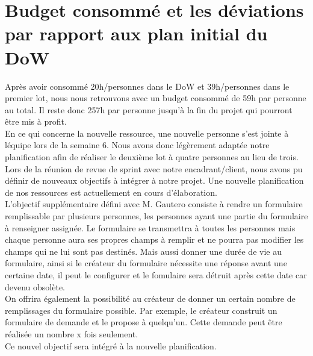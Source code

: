 \documentclass{sigplanconf}
\begin{document}
\section{Budget consomm\'e et les d\'eviations par rapport aux plan initial du DoW}
Apr\`es avoir consomm\'e 20h/personnes dans le DoW et 39h/personnes dans le premier lot, nous nous retrouvons avec un budget consomm\'e de 59h par personne au total. Il reste donc 257h par personne jusqu'\`a la fin du projet qui pourront \^etre mis \`a profit.\\
En ce qui concerne la nouvelle ressource, une nouvelle personne s'est jointe \`a l\'equipe lors de la semaine 6. Nous avons donc l\'eg\`erement adapt\'ee notre planification afin de r\'ealiser le deuxi\`eme lot \`a quatre personnes au lieu de trois. Lors de la r\'eunion de revue de sprint avec notre encadrant/client, nous avons pu d\'efinir de nouveaux objectifs \`a int\'egrer \`a notre projet. Une nouvelle planification de nos ressources est actuellement en cours d'\'elaboration.\\
L'objectif suppl\'ementaire d\'efini avec M. Gautero consiste \`a rendre un formulaire remplissable par plusieurs personnes, les personnes ayant une partie du formulaire à renseigner assign\'ee. Le formulaire se transmettra \`a toutes les personnes mais chaque personne aura ses propres champs \`a remplir et ne pourra pas modifier les champs qui ne lui sont pas destin\'es. Mais aussi donner une dur\'ee de vie au formulaire, ainsi si le cr\'eateur du formulaire n\'ecessite une r\'eponse avant une certaine date, il peut le configurer et le fomulaire sera d\'etruit apr\`es cette date car devenu obsol\`ete.\\
On offrira \'egalement la possibilit\'e au cr\'eateur de donner un certain nombre de remplissages du formulaire possible. Par exemple, le cr\'eateur construit un formulaire de demande et le propose \`a quelqu'un. Cette demande peut \^etre r\'ealis\'ee un nombre x fois seulement.\\
Ce nouvel objectif sera int\'egr\'e \`a la nouvelle planification.
\end{document}
